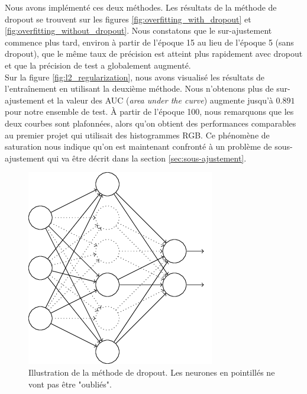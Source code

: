 \documentclass[a4paper,11pt]{article}
\begin{document}
    Nous avons implémenté ces deux méthodes.
    Les résultats de la méthode de dropout se trouvent sur les figures \ref{fig:overfitting_with_dropout} et \ref{fig:overfitting_without_dropout}.
    Nous constatons que le sur-ajustement commence plus tard, environ à partir de l'époque 15 au
    lieu de l'époque 5 (sans dropout), que le même taux de précision est atteint plus rapidement
    avec dropout et que la précision de test a globalement augmenté.
    \\
    Sur la figure \ref{fig:l2_regularization}, nous avons visualisé les résultats de l'entraînement en utilisant la deuxième méthode.
    Nous n'obtenons plus de sur-ajustement et la valeur des AUC (\textit{area under the curve})
    augmente jusqu'à $0.891$ pour notre ensemble de test.
    À partir de l'époque 100, nous remarquons que les deux courbes sont plafonnées, alors qu'on obtient des performances comparables au premier projet qui utilisait des histogrammes RGB.
    Ce phénomène de saturation nous indique qu'on est maintenant confronté à un problème de sous-ajustement qui va être décrit dans la section \ref{sec:sous-ajustement}.

	\begin{figure}[H]
	    \centering
	    \includegraphics[scale=0.5]{dropout_illustration.png}
	    \caption{Illustration de la méthode de dropout. Les neurones en pointillés ne vont pas être "oubliés".}
	    \label{fig:dropout_illustration}
	\end{figure}
\end{document}
